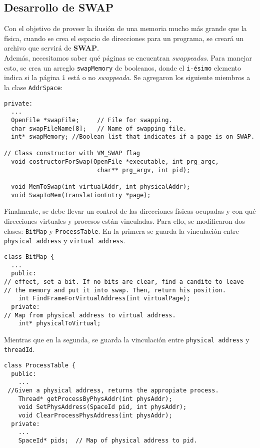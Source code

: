 \subsection*{Desarrollo de SWAP} \label{swap_subsec}
Con el objetivo de proveer la ilusión de una memoria mucho más grande que la física, cuando se crea el espacio de direcciones para un programa, se creará un archivo que servirá de \textbf{SWAP}.\\
Además, necesitamos saber qué páginas se encuentran \textit{swappeadas}. Para manejar esto, se crea un arreglo \texttt{swapMemory} de booleanos, donde el \texttt{i-ésimo} elemento indica si la página \texttt{i} está o no \textit{swappeada}.\newpage
Se agregaron los siguiente miembros a la clase \texttt{AddrSpace}:
\begin{lstlisting}[style=C]
private:
  ...
  OpenFile *swapFile;     // File for swapping.
  char swapFileName[8];   // Name of swapping file.
  int* swapMemory; //Boolean list that indicates if a page is on SWAP.
    
// Class constructor with VM_SWAP flag
  void costructorForSwap(OpenFile *executable, int prg_argc,
                          char** prg_argv, int pid);
                          
  void MemToSwap(int virtualAddr, int physicalAddr);
  void SwapToMem(TranslationEntry *page);
\end{lstlisting}
Finalmente, se debe llevar un control de las direcciones físicas ocupadas y con qué direcciones virtuales y procesos están vinculadas. Para ello, se modificaron dos clases: \texttt{BitMap} y \texttt{ProcessTable}. En la primera se guarda la vinculación entre \texttt{physical address} y \texttt{virtual address}.
\begin{lstlisting}[style=C]
class BitMap {
  ...
  public:
// effect, set a bit. If no bits are clear, find a candite to leave
// the memory and put it into swap. Then, return his position.
    int FindFrameForVirtualAddress(int virtualPage);
  private:
// Map from physical address to virtual address.
    int* physicalToVirtual;
\end{lstlisting}
Mientras que en la segunda, se guarda la vinculación entre \texttt{physical address} y \texttt{threadId}.
\begin{lstlisting}[style=C]
class ProcessTable {
  public:
    ...
 //Given a physical address, returns the appropiate process.
    Thread* getProcessByPhysAddr(int physAddr);
    void SetPhysAddress(SpaceId pid, int physAddr);
    void ClearProcessPhysAddress(int physAddr);
  private:
    ...
    SpaceId* pids;  // Map of physical address to pid.
\end{lstlisting}
